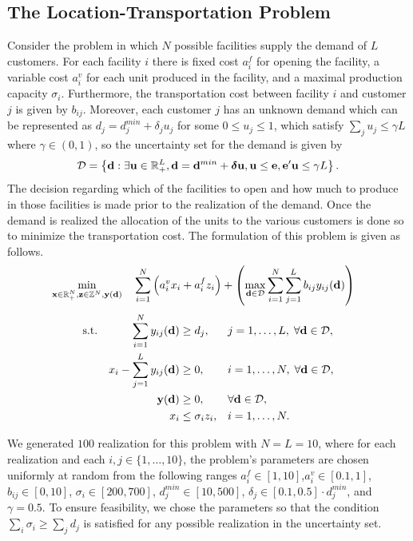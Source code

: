 \documentclass[12pt,x11names]{article}
\theoremstyle{definition}
\newcommand{\paren}[1]{\left\{ {#1} \right\}} %
\newcommand{\real}{\mathbb{R}} %
\newcommand{\integ}{\mathbb{Z}} %
\newcommand{\bone}{{\bf e}}
\newcommand{\bd}{{\bf d}}
\newcommand{\bu}{{\bf u}}
\newcommand{\bx}{{\bf x}}
\newcommand{\by}{{\bf y}}
\newcommand{\bz}{{\bf z}}
\newcommand{\bdelta}{{\boldsymbol \delta}}
\begin{document}
\subsection{The Location-Transportation Problem}
Consider the problem in which $N$ possible facilities supply the demand of $L$ customers. For each facility $i$ there is fixed cost $a^{f}_i$ for opening the facility, a variable cost  $a^v_i$ for each unit produced in the facility, and a maximal production capacity $\sigma_i$. Furthermore, the transportation cost between facility $i$ and customer $j$ is given by $b_{ij}$.
Moreover, each customer $j$ has an unknown demand which can be represented as
$d_j=d^{min}_j+\delta_j u_j$ for some $0\leq u_j\leq 1$, which satisfy $\sum_j u_j \leq \gamma L$ where $\gamma\in (0,1)$, so the uncertainty set for the demand is given by
$$\mathcal{D}=\paren{\bd:\exists \bu\in\real^L_+,\bd=\bd^{min}+\bdelta \bu, \bu\leq \bone, \bone'\bu\leq \gamma L}.$$
The decision regarding which of the facilities to open and how much to produce in those facilities is made prior to the realization of the demand. Once the demand is realized the allocation of the units to the various customers is done so to minimize the transportation cost. The formulation of this problem is given as follows.
{\begin{align}\label{Prob:Location Transportation}
&\min_{\bx\in\real^N_+,\bz\in \integ^N,\by(\bd)}\quad \sum_{i=1}^{N} \left(a^{v}_ix_i+a^{f}_iz_i\right)+\left(\max_{\bd\in\mathcal{D}}\sum_{i=1}^{N}\sum_{j=1}^L b_{ij}y_{ij}(\bd)\right)
\end{align}
\begin{equation*}
\begin{aligned}
&\text{s.t.}& \sum_{i=1}^N y_{ij}(\bd)&\geq d_j, && j=1,\ldots,L,\;\forall \bd\in \mathcal{D},\\
&& x_i-\sum_{j=1}^L y_{ij}(\bd)&\geq 0, && i=1,\ldots,N,\;\forall \bd\in \mathcal{D},\\
&&\by(\bd)&\geq 0,&&\forall \bd\in \mathcal{D},\\
&& x_i&\leq \sigma_iz_i,&& i=1,\ldots,N.
\end{aligned}
\end{equation*}
}

We generated $100$ realization for this problem with $N=L=10$, where for each realization and each $i,j\in\{1,\ldots,10\}$, the problem's parameters are chosen uniformly at random from the following ranges $a^{f}_i\in[1,10]$,$a^v_i\in[0.1,1]$,
$b_{ij}\in[0,10]$, $\sigma_i\in [200, 700]$,
$d^{min}_j\in[10,500]$, $\delta_j\in[0.1,0.5]\cdot d^{min}_j$, and $\gamma=0.5$. To ensure feasibility, we chose the parameters so that the condition $\sum_i \sigma_i \geq \sum_j d_j$ is satisfied for any possible realization in the uncertainty set.
\end{document}
